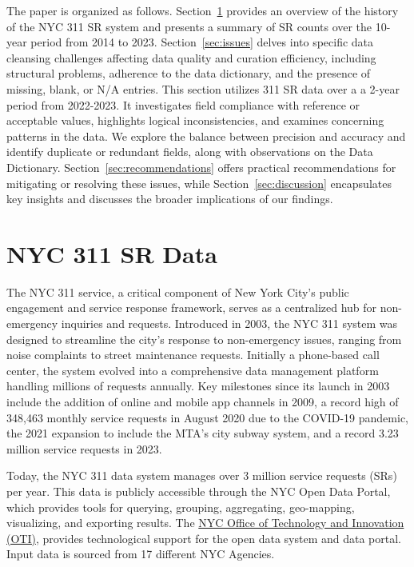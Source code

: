 \documentclass[linenumber]{jdsart}
\begin{document}
The paper is organized as follows. Section~\ref{sec:data} provides 
an overview of the history of the NYC 311 SR system and presents 
a summary of SR counts over the 10-year period from 2014 to 2023. 
Section~\ref{sec:issues} delves into specific data cleansing 
challenges affecting data quality and curation efficiency, 
including structural problems, adherence to the data dictionary, 
and the presence of missing, blank, or N/A entries. This section
utilizes 311 SR data over a a 2-year period from 2022-2023.  It 
 investigates field compliance with reference or acceptable values, 
highlights logical inconsistencies, and examines concerning patterns 
in the data. We explore the balance between precision and accuracy 
and identify duplicate or redundant fields, along with observations 
on the Data Dictionary. Section~\ref{sec:recommendations} offers 
practical recommendations for mitigating or resolving these issues, 
while Section~\ref{sec:discussion} encapsulates key insights and 
discusses the broader implications of our findings.


\section{NYC 311 SR Data} 
\label{sec:data}
The NYC 311 service, a critical component of New York City's public
engagement and service response framework, serves as a centralized hub
for non-emergency inquiries and requests. Introduced in 2003, the NYC
311 system was designed to streamline the city's response to
non-emergency issues, ranging from noise complaints to street
maintenance requests. Initially a phone-based call center, the system
evolved into a comprehensive data management platform handling
millions of requests annually. Key milestones since its launch in 2003
include the addition of online and mobile app channels in 2009, a
record high of 348,463 monthly service requests in August 2020 due to
the COVID-19 pandemic, the 2021 expansion to include the MTA's city
subway system, and a record 3.23 million service requests in
2023. 


Today, the NYC 311 data system manages over 3 million service
requests (SRs) per year. This data is publicly accessible through the NYC Open Data
Portal, which provides tools for querying, grouping, aggregating,
geo-mapping, visualizing, and exporting results. The
\href{https://www.nyc.gov/content/oti/pages/}{NYC Office of Technology
  and Innovation (OTI)}, provides technological support for the
open data system and data portal. Input data is sourced from 17 different
NYC Agencies. 
\end{document}

